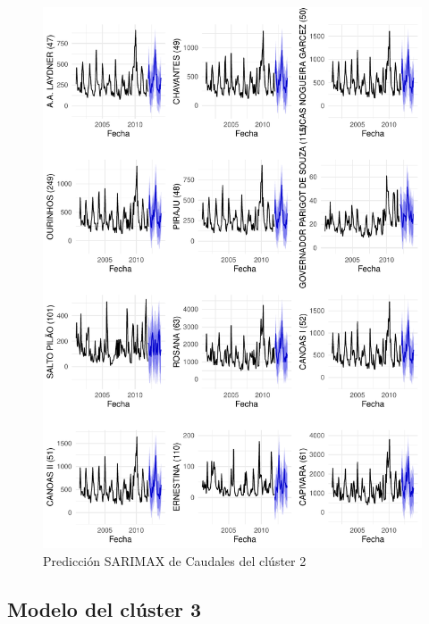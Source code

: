 \documentclass[12pt,oneside]{book}\usepackage[]{graphicx}\usepackage[]{color}
\makeatletter
\def\maxwidth{ %
  \ifdim\Gin@nat@width>\linewidth
    \linewidth
  \else
    \Gin@nat@width
  \fi
}
\newenvironment{knitrout}{}{} %
\theoremstyle{definition} %
\makeatother
\begin{document}
\begin{knitrout}
\color{fgcolor}\begin{figure}[h]

{\centering \includegraphics[width=\maxwidth,height=0.85\textheight]{figure/unnamed-chunk-104-1} 

}

\caption{\label{fig:pred_clx2} Predicción SARIMAX de Caudales del clúster 2}\label{fig:unnamed-chunk-104}
\end{figure}


\end{knitrout}






\subsection{Modelo del clúster 3}
\end{document}
